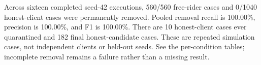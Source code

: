 Across sixteen completed seed-42 executions, 560/560 free-rider cases and 0/1040 honest-client cases were permanently removed. Pooled removal recall is 100.00\%, precision is 100.00\%, and F1 is 100.00\%. There are 10 honest-client cases ever quarantined and 182 final honest-candidate cases. These are repeated simulation cases, not independent clients or held-out seeds. See the per-condition tables; incomplete removal remains a failure rather than a missing result.
